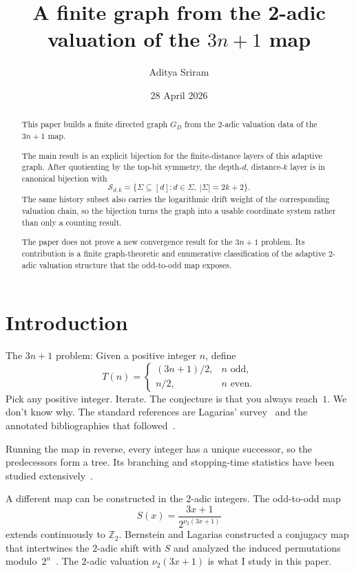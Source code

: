 \documentclass[11pt]{amsart}
\title{A finite graph from the 2-adic valuation of the \texorpdfstring{$3n+1$}{3n+1} map}
\author{Aditya Sriram}
\date{28 April 2026}
\theoremstyle{definition}
\theoremstyle{remark}
\newcommand{\Sfam}{\mathcal S}
\begin{document}
\begin{abstract}
\setlength{\parskip}{0.6em} 
\setlength{\parindent}{0pt} 
This paper builds a finite directed graph $G_D$ from the $2$-adic valuation
data of the $3n+1$ map.

The main result is an explicit bijection for the finite-distance layers of
this adaptive graph.  After quotienting by the top-bit symmetry, the
depth-$d$, distance-$k$ layer is in canonical bijection with
\[
\Sfam_{d,k}
=
\{\Sigma\subseteq[d]:d\in\Sigma,\ |\Sigma|=2k+2\}.
\]
The same history subset also carries the logarithmic drift weight of the
corresponding valuation chain, so the bijection turns the graph into a
usable coordinate system rather than only a counting result.

The paper does not prove a new convergence result for the $3n+1$ problem.
Its contribution is a finite graph-theoretic and enumerative classification
of the adaptive $2$-adic valuation structure that the odd-to-odd map exposes.
\end{abstract}
\maketitle

\section{Introduction}\label{sec:introduction}
The $3n+1$ problem: Given a positive integer $n$, define
\[
T(n)=
\begin{cases}
(3n+1)/2, & n\text{ odd},\\
n/2, & n\text{ even}.
\end{cases}
\]
Pick any positive integer.  Iterate.  The conjecture is that you always
reach~$1$.  We don't know why.  The standard references are Lagarias'
survey~\cite{Lagarias1985} and the annotated bibliographies that
followed~\cite{LagariasAnnotated1999, LagariasAnnotated2009, Lagarias2010}.

Running the map in reverse, every integer has a unique successor, so the predecessors form a tree.
Its branching and stopping-time statistics have been studied extensively~\cite{ApplegateLagarias1995, ApplegateLagarias2003, Wirsching1998}.

A different map can be constructed in the $2$-adic integers.  The odd-to-odd
map
\[
S(x)=\frac{3x+1}{2^{\nu_2(3x+1)}}
\]
extends continuously to $\mathbb{Z}_2$.  Bernstein and Lagarias constructed a
conjugacy map that intertwines the $2$-adic shift with $S$ and analyzed the
induced permutations modulo~$2^n$~\cite{Bernstein1994,
BernsteinLagarias1996}.  The $2$-adic valuation $\nu_2(3x+1)$ is what I study 
in this paper.
\end{document}
